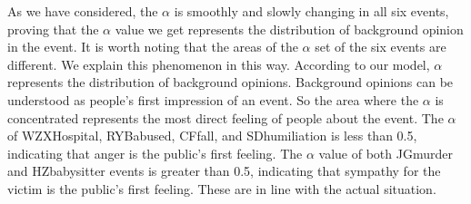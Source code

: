 \documentclass[runningheads]{llncs}
\begin{document}
As we have considered, the $\alpha$ is smoothly and slowly changing in all six events, proving that the $\alpha$ value we get represents the distribution of background opinion in the event. It is worth noting that the areas of the $\alpha$ set of the six events are different. We explain this phenomenon in this way. According to our model, $\alpha$ represents the distribution of background opinions. Background opinions can be understood as people's first impression of an event. So the area where the $\alpha$ is concentrated represents the most direct feeling of people about the event. The $\alpha$ of WZXHospital, RYBabused, CFfall, and SDhumiliation is less than 0.5, indicating that anger is the public's first feeling. The $\alpha$ value of both JGmurder and HZbabysitter events is greater than 0.5, indicating that sympathy for the victim is the public's first feeling. These are in line with the actual situation.
\end{document}

